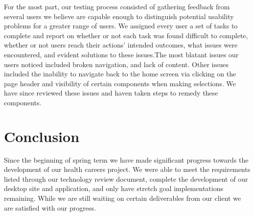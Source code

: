 \documentclass[onecolumn, draftclsnofoot,10pt, compsoc]{IEEEtran}
\begin{document}
\noindent For the most part, our testing process consisted of gathering feedback from several users we believe are capable enough to distinguish potential usability problems for a greater range of users. 
We assigned every user a set of tasks to complete and report on whether or not each task was found difficult to complete, whether or not users reach their actions’ intended outcomes, what issues were encountered, and evident solutions to these issues.The most blatant issues our users noticed included broken navigation, and lack of content. Other issues included the inability to navigate back to the home screen via clicking on the page header and visibility of certain components when making selections. We have since reviewed these issues and haven taken steps to remedy these components. 

\section{Conclusion}

\noindent Since the beginning of spring term we have made significant progress towards the development of our health careers project. We were able to meet the requirements listed through our technology review document, complete the development of our desktop site and application, and only have stretch goal implementations remaining. While we are still waiting on certain deliverables from our client we are satisfied with our progress.
\end{document}
